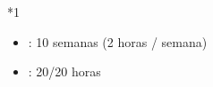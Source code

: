 \documentclass[letterpaper,10pt,spanish]{sphinxmanual}
\begin{document}
\begin{savenotes}
\begin{tabular}[t]{}
\begin{savenotes}
\begin{tabular}[t]{*{1}{}}
\begin{itemize}
\item {} 
\sphinxAtStartPar
{}: 10 semanas (2 horas / semana)

\item {} 
\sphinxAtStartPar
{}: 20/20 horas

\end{itemize}
\\
\sphinxbottomrule
\end{tabular}
\sphinxtableafterendhook\par
\sphinxattableend\end{savenotes}
\\
\sphinxbottomrule
\end{tabular}
\sphinxtableafterendhook\par
\sphinxattableend\end{savenotes}
\end{document}
